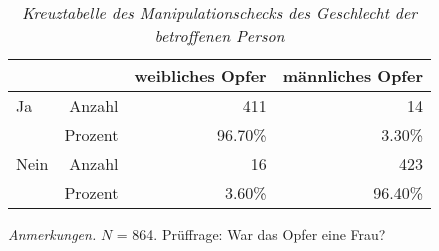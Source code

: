 \begin{table}[htb]
    \caption[Kreuztabelle Manipulationscheck Opfergeschlecht]{\textit {Kreuztabelle des Manipulationschecks des Geschlecht der betroffenen Person}} 
    \label{KT_sex}
    \centering
    \begin{adjustbox}{width=10cm} %
    \small
    \begin{tabular}{lrrr}
      \hline
        &   & weibliches Opfer & männliches Opfer \\
      \hline
    Ja   & Anzahl  & 411      & 14      \\
         & Prozent & 96.70\%  & 3.30\%  \\
    Nein & Anzahl  & 16       & 423     \\
         & Prozent & 3.60\%   & 96.40\% \\
       \hline
    \end{tabular}
    \end{adjustbox}
    
    \begin{tablenotes}
        \item \textit{Anmerkungen.} \( N \) = 864. Prüffrage: War das Opfer eine Frau?
      \end{tablenotes}
    \end{table}